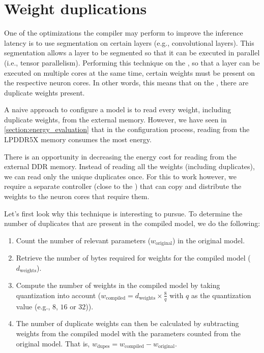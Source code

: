 \section{Weight duplications}
One of the optimizations the compiler may perform to improve the inference latency is to use segmentation on certain layers (e.g., convolutional layers).
This segmentation allows a layer to be segmented so that it can be executed in parallel (i.e., tensor parallelism).
Performing this technique on the \graicore{}, so that a layer can be executed on multiple cores at the same time, certain weights must be present on the respective neuron cores.
In other words, this means that on the \graicore{}, there are duplicate weights present.

A naive approach to configure a model is to read every weight, including duplicate weights, from the external memory.
However, we have seen in \cref{section:energy_evaluation} that in the configuration process, reading from the LPDDR5X memory consumes the most energy.

There is an opportunity in decreasing the energy cost for reading from the external DDR memory.
Instead of reading all the weights (including duplicates), we can read only the unique duplicates once.
For this to work however, we require a separate controller (close to the \graicore{}) that can copy and distribute the weights to the neuron cores that require them.

Let's first look why this technique is interesting to pursue.
To determine the number of duplicates that are present in the compiled model, we do the following:
\begin{enumerate}
    \item
    Count the number of relevant parameters ($w_\textrm{original}$) in the original model.
    \item
    Retrieve the number of bytes required for weights for the compiled model ($d_\textrm{weights}$).
    \item
    Compute the number of weights in the compiled model by taking quantization into account ($w_\textrm{compiled} = d_\textrm{weights} \times \frac{8}{q}$ with $q$ as the quantization value (e.g., $8$, $16$ or $32$)).
    \item  
    The number of duplicate weights can then be calculated by subtracting weights from the compiled model with the parameters counted from the original model. That is, $w_\textrm{dupes} = w_\textrm{compiled} - w_\textrm{original}$.
\end{enumerate}

